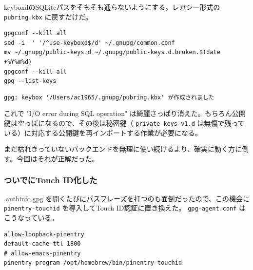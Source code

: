 \documentclass[11pt]{article}
\begin{document}
keyboxdのSQLiteパスをそもそも通らないようにする。レガシー形式の \texttt{pubring.kbx} に戻すだけだ。

\begin{verbatim}
gpgconf --kill all
sed -i '' '/^use-keyboxd$/d' ~/.gnupg/common.conf
mv ~/.gnupg/public-keys.d ~/.gnupg/public-keys.d.broken.$(date +%Y%m%d)
gpgconf --kill all
gpg --list-keys
\end{verbatim}

\begin{verbatim}
gpg: keybox '/Users/ac1965/.gnupg/pubring.kbx' が作成されました
\end{verbatim}

これで "I/O error during SQL operation" は綺麗さっぱり消えた。もちろん公開鍵は空っぽになるので、その後は秘密鍵（ \texttt{private-keys-v1.d} は無傷で残っている）に対応する公開鍵を再インポートする作業が必要になる。

まだ枯れきっていないバックエンドを無理に使い続けるより、確実に動く方に倒す。今回はそれが正解だった。
\subsubsection{ついでにTouch ID化した}
\label{sec:org167c128}

.authinfo.gpg を開くたびにパスフレーズを打つのも面倒だったので、この機会に \texttt{pinentry-touchid} を導入してTouch ID認証に置き換えた。 \texttt{gpg-agent.conf} はこうなっている。

\begin{verbatim}
allow-loopback-pinentry
default-cache-ttl 1800
# allow-emacs-pinentry
pinentry-program /opt/homebrew/bin/pinentry-touchid
\end{verbatim}
\end{document}
